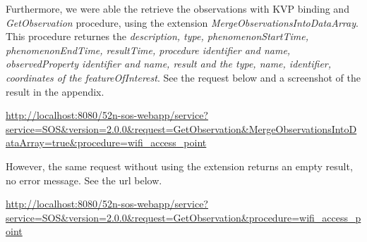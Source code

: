 Furthermore, we were able the retrieve the observations with KVP binding and
\textit{GetObservation} procedure, using the extension
\textit{MergeObservationsIntoDataArray}. This procedure returnes the
\textit{description, type, phenomenonStartTime, phenomenonEndTime, 
resultTime, procedure identifier and name, observedProperty identifier and 
name, result and the type, name, identifier, coordinates of the 
featureOfInterest}. See the request below and a screenshot of the result in the 
appendix.
\begin{sloppypar}
\url{http://localhost:8080/52n-sos-webapp/service?service=SOS&version=2.0.0&request=GetObservation&MergeObservationsIntoDataArray=true&procedure=wifi_access_point}
\end{sloppypar}
However, the same request without using the extension returns an empty result,
no error message. See the url below.

\begin{sloppypar}
\url{http://localhost:8080/52n-sos-webapp/service?service=SOS&version=2.0.0&request=GetObservation&procedure=wifi_access_point}
\end{sloppypar}